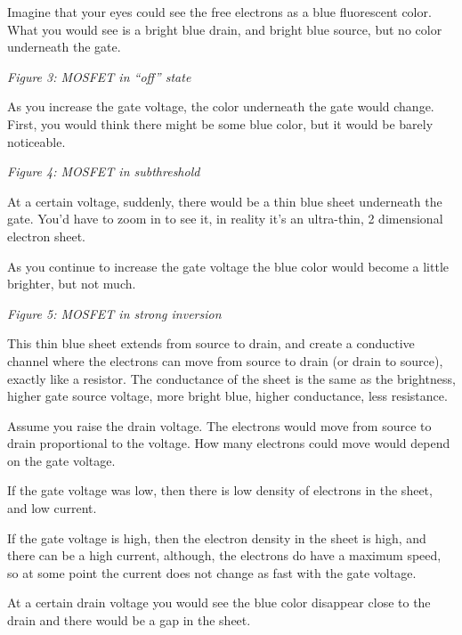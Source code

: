 Imagine that your eyes could see the free electrons as a blue
fluorescent color. What you would see is a bright blue drain, and bright
blue source, but no color underneath the gate.


{
\centering
{}
}

\emph{Figure 3: MOSFET in ``off'' state }

As you increase the gate voltage, the color underneath the gate would
change. First, you would think there might be some blue color, but it
would be barely noticeable.


{
\centering
{}
}

\emph{Figure 4: MOSFET in subthreshold }

At a certain voltage, suddenly, there would be a thin blue sheet
underneath the gate. You'd have to zoom in to see it, in reality it's an
ultra-thin, 2 dimensional electron sheet.

As you continue to increase the gate voltage the blue color would become
a little brighter, but not much.


{
\centering
{}
}

\emph{Figure 5: MOSFET in strong inversion }

This thin blue sheet extends from source to drain, and create a
conductive channel where the electrons can move from source to drain (or
drain to source), exactly like a resistor. The conductance of the sheet
is the same as the brightness, higher gate source voltage, more bright
blue, higher conductance, less resistance.

Assume you raise the drain voltage. The electrons would move from source
to drain proportional to the voltage. How many electrons could move
would depend on the gate voltage.

If the gate voltage was low, then there is low density of electrons in
the sheet, and low current.

If the gate voltage is high, then the electron density in the sheet is
high, and there can be a high current, although, the electrons do have a
maximum speed, so at some point the current does not change as fast with
the gate voltage.

At a certain drain voltage you would see the blue color disappear close
to the drain and there would be a gap in the sheet.


{
\centering
{}
}

